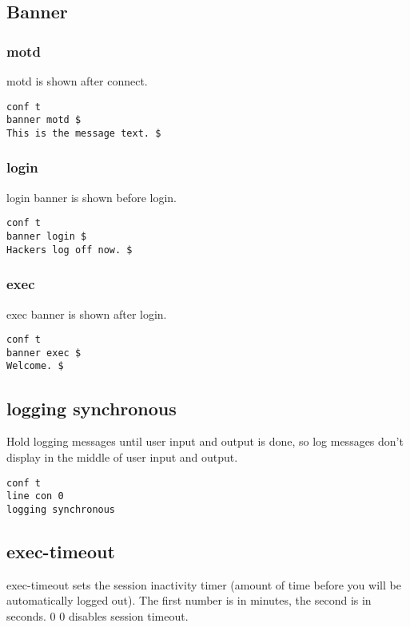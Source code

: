 \subsection{Banner}

\subsubsection{motd}

motd is shown after connect.

\begin{verbatim}
conf t
banner motd $
This is the message text. $
\end{verbatim}

\subsubsection{login}

login banner is shown before login.

\begin{verbatim}
conf t
banner login $
Hackers log off now. $
\end{verbatim}

\subsubsection{exec}

exec banner is shown after login.

\begin{verbatim}
conf t
banner exec $
Welcome. $
\end{verbatim}

\subsection{logging synchronous}

Hold logging messages until user input and output is done, so log messages
don't display in the middle of user input and output.

\begin{verbatim}
conf t
line con 0
logging synchronous
\end{verbatim}

\subsection{exec-timeout}

exec-timeout sets the session inactivity timer (amount of time before you will
be automatically logged out). The first number is in minutes, the second
is in seconds. 0 0 disables session timeout.

